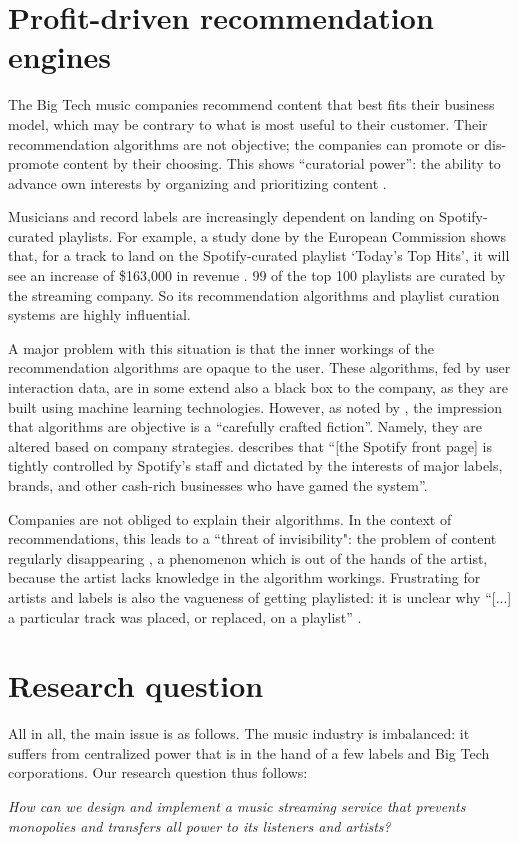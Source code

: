 \section{Profit-driven recommendation engines}
\label{sec:problem-description-recommendations}
The Big Tech music companies recommend content that best fits their business model, which may be contrary to what is most useful to their customer. Their recommendation algorithms are not objective; the companies can promote or dis-promote content by their choosing. This shows ``curatorial power'': the ability to advance own interests by organizing and prioritizing content \citep{prey2020locating}.

Musicians and record labels are increasingly dependent on landing on Spotify-curated playlists. For example, a study done by the European Commission shows that, for a track to land on the Spotify-curated playlist `Today's Top Hits', it will see an increase of \$163,000 in revenue \citep{aguiar2018platforms}. 99 of the top 100 playlists are curated by the streaming company. So its recommendation algorithms and playlist curation systems are highly influential. 

A major problem with this situation is that the inner workings of the recommendation algorithms are opaque to the user. These algorithms, fed by user interaction data, are in some extend also a black box to the company, as they are built using machine learning technologies. However, as noted by \cite{gillespie2014relevance}, the impression that algorithms are objective is a ``carefully crafted fiction''. Namely, they are altered based on company strategies. \cite{thebaffler2017} describes that ``[the Spotify front page] is tightly controlled by Spotify’s staff and dictated by the interests of major labels, brands, and other cash-rich businesses who have gamed the system''.

Companies are not obliged to explain their algorithms. In the context of recommendations, this leads to a ``threat of invisibility": the problem of content regularly disappearing \citep{bucher2018if}, a phenomenon which is out of the hands of the artist, because the artist lacks knowledge in the algorithm workings. Frustrating for artists and labels is also the vagueness of getting playlisted: it is unclear why ``[...] a particular track was placed, or replaced, on a playlist'' \citep{prey2020locating}.

\section{Research question}
\label{research-question}
All in all, the main issue is as follows. The music industry is imbalanced: it suffers from centralized power that is in the hand of a few labels and Big Tech corporations. Our research question thus follows:

\textit{How can we design and implement a music streaming service that prevents monopolies and transfers all power to its listeners and artists?}
